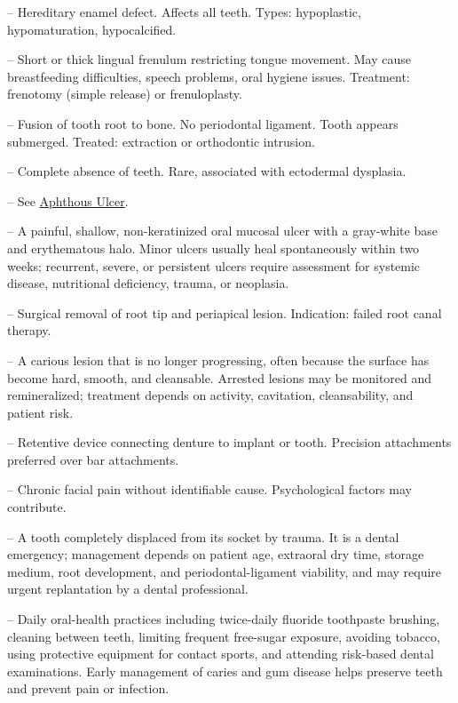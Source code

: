 -- Hereditary enamel defect. Affects all teeth. Types: hypoplastic, hypomaturation, hypocalcified.

-- Short or thick lingual frenulum restricting tongue movement. May cause breastfeeding difficulties, speech problems, oral hygiene issues. Treatment: frenotomy (simple release) or frenuloplasty.

-- Fusion of tooth root to bone. No periodontal ligament. Tooth appears submerged. Treated: extraction or orthodontic intrusion.

-- Complete absence of teeth. Rare, associated with ectodermal dysplasia.

-- See \hyperlink{Aphthous Ulcer}{Aphthous Ulcer}.

-- A painful, shallow, non-keratinized oral mucosal ulcer with a gray-white base and erythematous halo. Minor ulcers usually heal spontaneously within two weeks; recurrent, severe, or persistent ulcers require assessment for systemic disease, nutritional deficiency, trauma, or neoplasia.

-- Surgical removal of root tip and periapical lesion. Indication: failed root canal therapy.

-- A carious lesion that is no longer progressing, often because the surface has become hard, smooth, and cleansable. Arrested lesions may be monitored and remineralized; treatment depends on activity, cavitation, cleansability, and patient risk.

-- Retentive device connecting denture to implant or tooth. Precision attachments preferred over bar attachments.

-- Chronic facial pain without identifiable cause. Psychological factors may contribute.

-- A tooth completely displaced from its socket by trauma. It is a dental emergency; management depends on patient age, extraoral dry time, storage medium, root development, and periodontal-ligament viability, and may require urgent replantation by a dental professional.

-- Daily oral-health practices including twice-daily fluoride toothpaste brushing, cleaning between teeth, limiting frequent free-sugar exposure, avoiding tobacco, using protective equipment for contact sports, and attending risk-based dental examinations. Early management of caries and gum disease helps preserve teeth and prevent pain or infection.

